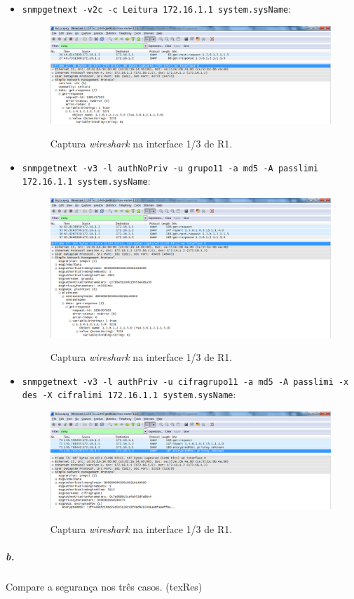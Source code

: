 \begin{itemize}
\item \texttt{snmpgetnext -v2c -c Leitura 172.16.1.1 system.sysName}:

\begin{figure}[h]
\centering
\includegraphics[width=1\textwidth, height=0.33\textheight]{8a1.png}
\label{fig:2-capturaWireshark}
\caption{Captura \emph{wireshark} na interface \textsf{1/3} de \textsf{R1}.}
\end{figure}


\item \texttt{snmpgetnext -v3 -l authNoPriv -u grupo11 -a md5 -A passlimi 172.16.1.1 system.sysName}:

\begin{figure}[h]
\centering
\includegraphics[width=1\textwidth, height=0.33\textheight]{8a2.png}
\label{fig:2-capturaWireshark}
\caption{Captura \emph{wireshark} na interface \textsf{1/3} de \textsf{R1}.}
\end{figure}


\item \texttt{snmpgetnext -v3 -l authPriv -u cifragrupo11 -a md5 -A passlimi -x des -X cifralimi 172.16.1.1 system.sysName}:

\begin{figure}[h]
\centering
\includegraphics[width=1\textwidth, height=0.33\textheight]{8a3.png}
\label{fig:2-capturaWireshark}
\caption{Captura \emph{wireshark} na interface \textsf{1/3} de \textsf{R1}.}
\end{figure}

\end{itemize}


\subparagraph{b.}
Compare a segurança nos três casos. (texRes)